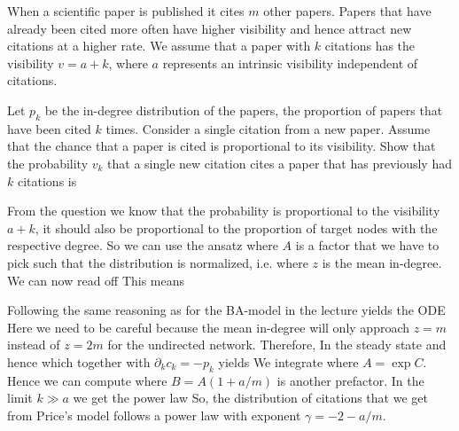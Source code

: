 \label{exGrowthPrice}
When a scientific paper is published it cites $m$ other papers. Papers that have already been cited more often have higher visibility and hence attract new citations at a higher rate. We assume that a paper with $k$ citations has the visibility $v=a+k$, where $a$ represents an intrinsic visibility independent of citations.

\subquestion Let $p_k$ be the in-degree distribution of the papers, the proportion of papers that have been cited $k$ times. Consider a single citation from a new paper. Assume that the chance that a paper is cited is proportional to its visibility. Show that the probability $v_k$ that a single new citation cites a paper that has previously had $k$ citations is 

\solution
From the question we know that the probability is proportional to the visibility $a+k$, it should also be proportional to the proportion of target nodes with the respective degree. So we can use the ansatz
where $A$ is a factor that we have to pick such that the distribution is normalized, i.e.
where $z$ is the mean in-degree. We can now read off 
This means  


\solution
Following the same reasoning as for the BA-model in the lecture yields the ODE
Here we need to be careful because the mean in-degree will only approach 
$z=m$ instead of $z=2m$ for the undirected network. Therefore, 
In the steady state
and hence
which together with $\partial_k c_k =-p_k$ yields
We integrate 
where $A=\exp{C}$. Hence we can compute 
where $B=A(1+a/m)$ is another prefactor. In the limit $k\gg a$ we get the power law
So, the distribution of citations that we get from Price's model follows a power law with exponent $\gamma=-2-a/m$.
